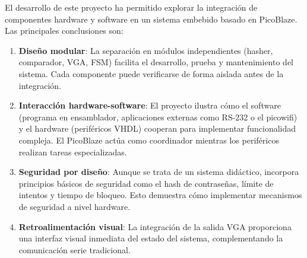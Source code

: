 \documentclass[a4paper, 12pt]{report}
\begin{document}
El desarrollo de este proyecto ha permitido explorar la integración de componentes hardware y software en un sistema embebido basado en PicoBlaze. Las principales conclusiones son:

\begin{enumerate}

    \item \textbf{Diseño modular}: La separación en módulos independientes (hasher, comparador, VGA, FSM) facilita el desarrollo, prueba y mantenimiento del sistema. Cada componente puede verificarse de forma aislada antes de la integración.

    \item \textbf{Interacción hardware-software}: El proyecto ilustra cómo el software (programa en ensamblador, aplicaciones externas como RS-232 o el picowifi) y el hardware (periféricos VHDL) cooperan para implementar funcionalidad compleja. El PicoBlaze actúa como coordinador mientras los periféricos realizan tareas especializadas.

    \item \textbf{Seguridad por diseño}: Aunque se trata de un sistema didáctico, incorpora principios básicos de seguridad como el hash de contraseñas, límite de intentos y tiempo de bloqueo. Esto demuestra cómo implementar mecanismos de seguridad a nivel hardware.

    \item \textbf{Retroalimentación visual}: La integración de la salida VGA proporciona una interfaz visual inmediata del estado del sistema, complementando la comunicación serie tradicional.
\end{enumerate}
\end{document}
